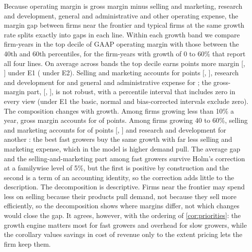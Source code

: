Because operating margin is gross margin minus selling and marketing, research and development, general and administrative and other operating expense, the margin gap between firms near the frontier and typical firms at the same growth rate splits exactly into gaps in each line. Within each growth band we compare firm-years in the top decile of GAAP operating margin with those between the 40th and 60th percentiles, for the firm-years with growth of 0 to 60\% that report all four lines. On average across bands the top decile earns \GapV{} points more margin [\GapVLo, \GapVHi] under E1 (\GapVEtwo{} under E2). Selling and marketing accounts for \GapVSM{} points [\GapVSMLo, \GapVSMHi], research and development for \GapVRD{} and general and administrative expense for \GapVGA; the gross-margin part, \GapVGM{} [\GapVGMLo, \GapVGMHi], is not robust, with a percentile interval that includes zero in every view (under E1 the basic, normal and bias-corrected intervals exclude zero). The composition changes with growth. Among firms growing less than 10\% a year, gross margin accounts for \GapVSlowGM{} of \GapVSlow{} points. Among firms growing 40 to 60\%, selling and marketing accounts for \GapVFastSM{} of \GapVFast{} points [\GapVFastSMLo, \GapVFastSMHi] and research and development for another \GapVFastRD: the best fast growers buy the same growth with far less selling and marketing expense, which in the model is higher demand pull. The average gap and the selling-and-marketing part among fast growers survive Holm's correction at a familywise level of 5\%, but the first is positive by construction and the second is a term of an accounting identity, so the correction adds little to the description. The decomposition is descriptive. Firms near the frontier may spend less on selling because their products pull demand, not because they sell more efficiently, so the decomposition shows where margins differ, not which changes would close the gap. It agrees, however, with the ordering of \autoref{cor:priorities}: the growth engine matters most for fast growers and overhead for slow growers, while the corollary values savings in cost of revenue only to the extent pricing lets the firm keep them.

